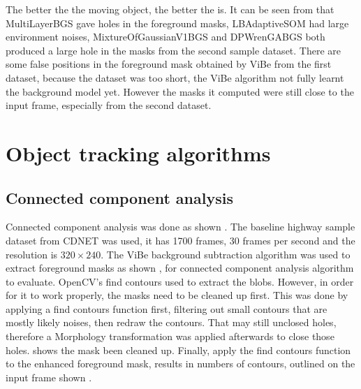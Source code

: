 
The better the  the moving object, the better the  is. It can be seen from  that MultiLayerBGS gave  holes in the foreground masks, LBAdaptiveSOM had large environment noises, MixtureOfGaussianV1BGS and DPWrenGABGS both produced a large hole in the masks from the second sample dataset. There are some false positions in the foreground mask obtained by ViBe from the first dataset, because the dataset was too short,  the ViBe algorithm  not fully learnt the background model yet. However the masks it computed were still close to the input frame, especially from the second dataset.

\section{Object tracking algorithms}



\subsection{Connected component analysis}

Connected component analysis was done as shown  . The baseline highway sample dataset from CDNET \cite{goyette2012changedetection} was used, it has 1700 frames, 30 frames per second and the resolution is $320 \times 240$. The ViBe background subtraction algorithm was used to extract foreground masks as shown  , for connected component analysis algorithm to evaluate. OpenCV's find contours  used to extract the blobs. However, in order for it to work properly, the masks need to be cleaned up first. This was done by applying a find contours function first, filtering out small contours that are mostly likely noises, then redraw the contours. That may still  unclosed holes, therefore a Morphology transformation \cite{serra1982image} was applied afterwards to close those holes.  shows the mask been cleaned up. Finally, apply the find contours function to the enhanced foreground mask, results in numbers of contours, outlined on the input frame shown  .

